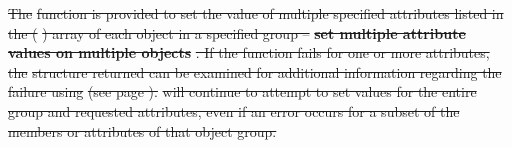 \documentclass[12pt]{report} %
\providecommand{\DIFdeltex}[1]{{\protect\color{red}\sout{#1}}}                      %
\providecommand{\DIFdel}[1]{\texorpdfstring{\DIFdeltex{#1}}{}} %
\begin{document}
\DIFdel{The }%
\DIFdel{function is provided to set the value of multiple specified attributes listed in the  (}%
\DIFdel{) array of each object in a specified group -- }\textbf{\DIFdel{set multiple attribute values on multiple objects}}%
\DIFdel{.
If the function fails for one or more attributes, the }%
\DIFdel{structure returned can be examined for additional information regarding the failure using }%
\DIFdel{(see page \pageref{func:StatusPopError}).
}%
\DIFdel{will continue to attempt to set values for the entire group and requested attributes, even if an error occurs for a subset of the members or attributes of that object group.
}%

\end{document}
